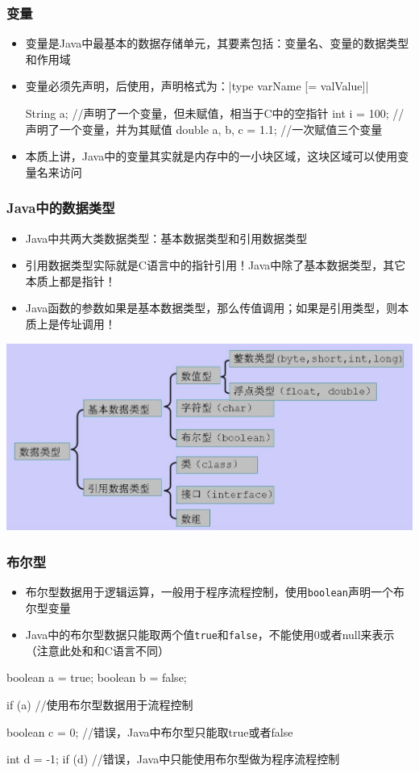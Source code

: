 \begin{frame}[fragile]
  \frametitle{变量}
  \begin{itemize}
    \item 变量是Java中最基本的数据存储单元，其要素包括：变量名、变量的数据类型和作用域
    \item 变量必须先声明，后使用，声明格式为：\java|type varName [= valValue]|
    \begin{javacode}
      String a; //声明了一个变量，但未赋值，相当于C中的空指针
      int i = 100; //声明了一个变量，并为其赋值
      double a, b, c = 1.1; //一次赋值三个变量
    \end{javacode}
    \item 本质上讲，Java中的变量其实就是内存中的一小块区域，这块区域可以使用变量名来访问
  \end{itemize}
\end{frame}

\begin{frame}
  \frametitle{Java中的数据类型}
  \begin{itemize}
    \item Java中共两大类数据类型：基本数据类型和引用数据类型
    \item 引用数据类型实际就是C语言中的指针引用！Java中除了基本数据类型，其它本质上都是指针！
    \item Java函数的参数如果是基本数据类型，那么传值调用；如果是引用类型，则本质上是传址调用！
  \end{itemize}
  \includegraphics[width=\textwidth]{figures/data_types}
\end{frame}


\begin{frame}[fragile]
  \frametitle{布尔型}
  \begin{itemize}
    \item 布尔型数据用于逻辑运算，一般用于程序流程控制，使用\texttt{boolean}声明一个布尔型变量
    \item Java中的布尔型数据只能取两个值\texttt{true}和\texttt{false}，不能使用0或者null来表示（注意此处和和C语言不同）
  \end{itemize}
  \begin{javacode}
    boolean a = true;
    boolean b = false;
    
    if (a) { //使用布尔型数据用于流程控制
    }
    
    boolean c = 0; //错误，Java中布尔型只能取true或者false
    
    int d = -1;
    if (d) { //错误，Java中只能使用布尔型做为程序流程控制
    }
  \end{javacode}
\end{frame}

